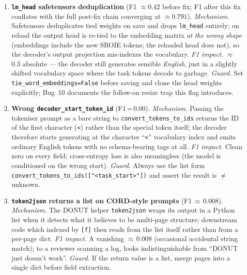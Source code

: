 \documentclass[conference]{IEEEtran}
\begin{document}
\begin{enumerate}

\item \textbf{\texttt{lm\_head} safetensors deduplication}
  (F1 $\approx 0.42$ before fix; F1 after this fix conflates with the
  full post-fix chain converging at $\approx 0.791$).
  \textit{Mechanism.} Safetensors deduplicates tied weights on save
  and drops \texttt{lm\_head} entirely; on reload the output head
  is re-tied to the embedding matrix \emph{at the wrong shape}
  (embeddings include the new SROIE tokens; the reloaded head does
  not), so the decoder's output projection mis-indexes the vocabulary.
  \textit{F1 impact.} $\approx$\,0.3 absolute --- the decoder still
  generates sensible \emph{English}, just in a slightly shifted
  vocabulary space where the task tokens decode to garbage.
  \textit{Guard.} Set \texttt{tie\_word\_embeddings=False} before
  saving and clone the head weights explicitly; Bug~10 documents
  the follow-on resize trap this flag introduces.

\item \textbf{Wrong \texttt{decoder\_start\_token\_id}} (F1\,=\,0.00).
  \textit{Mechanism.} Passing the tokeniser prompt as a bare string
  to \texttt{convert\_tokens\_to\_ids} returns the ID of the first
  character (\texttt{<}) rather than the special token itself; the
  decoder therefore starts generating at the character ``\texttt{<}''
  vocabulary index and emits ordinary English tokens with no
  schema-bearing tags at all.  \textit{F1 impact.} Clean zero on
  every field; cross-entropy loss is also meaningless (the model is
  conditioned on the wrong start).  \textit{Guard.} Always use the
  list form \texttt{convert\_tokens\_to\_ids(["<task\_start>"])}
  and assert the result is $\neq$ unknown.

\item \textbf{\texttt{token2json} returns a list on CORD-style prompts}
  (F1\,$\approx$\,0.008).
  \textit{Mechanism.} The DONUT helper \texttt{token2json} wraps its
  output in a Python list when it detects what it believes to be
  multi-page structure; downstream code which indexed by \texttt{[f]}
  then reads from the list itself rather than from a per-page dict.
  \textit{F1 impact.} A vanishing $\approx$\,0.008 (occasional
  accidental string match); to a reviewer scanning a log, looks
  indistinguishable from ``DONUT just doesn't work''.
  \textit{Guard.} If the return value is a list, merge pages into a
  single dict before field extraction.


\end{enumerate}
\end{document}

